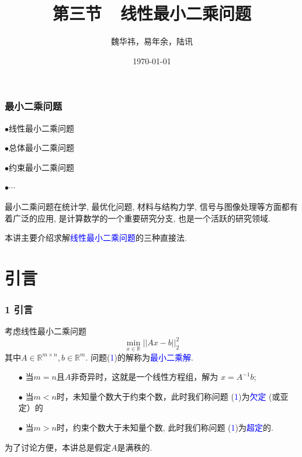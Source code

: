\documentclass[notheorems,serif]{beamer}
\begin{document}
\title[]{第三节~~线性最小二乘问题}

\author[]{魏华祎，易年余，陆讯}


\date{\today}

\frame[plain]{\titlepage}




\begin{frame}
\frametitle{最小二乘问题}   
\qquad$\bullet$线性最小二乘问题

\qquad$\bullet$总体最小二乘问题

\qquad$\bullet$约束最小二乘问题

\qquad$\bullet$$\cdots$

最小二乘问题在统计学, 最优化问题, 材料与结构力学, 信号与图像处理等方面都有着广泛的应用, 是计算数学的一个重要研究分支, 也是一个活跃的研究领域.

本讲主要介绍求解\textcolor{blue}{线性最小二乘问题}的三种直接法.
\end{frame}
\section{引言}
\begin{frame}
\frametitle{1 引言}
\noindent 考虑线性最小二乘问题
\begin{equation}
\min_{x\in\mathbb{R}} ||Ax-b||_2^2
\end{equation}
其中$A\in\mathbb{R}^{m\times n},b\in\mathbb{R}^m$.
问题(\textcolor{blue}{1})的解称为\textcolor{blue}{最小二乘解}.
\begin{itemize}
	\item[$\bullet$]当$m=n$且$A$非奇异时，这就是一个线性方程组，解为        $x=A^{-1}b$;
	\item[$\bullet$]当$m<n$时，未知量个数大于约束个数，此时我们称问题
	(\textcolor{blue}{1})为\textcolor{blue}{欠定}
	(或亚定）的
	\item[$\bullet$]当$m>n$时，约束个数大于未知量个数, 此时我们称问题
	(\textcolor{blue}{1})为\textcolor{blue}{超定}的.
\end{itemize}

为了讨论方便，本讲总是假定$A$是满秩的.
\end{frame}
\end{document}
